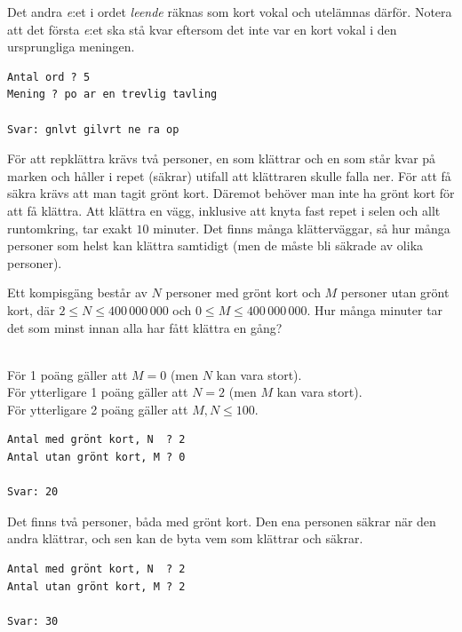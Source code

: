  Det andra \emph{e}:et i ordet \emph{leende} räknas som kort vokal och utelämnas därför. Notera att det första \emph{e}:et ska stå kvar eftersom det inte var en kort vokal i den ursprungliga meningen.

\vspace{1cm}

\begin{verbatim}
Antal ord ? 5
Mening ? po ar en trevlig tavling

Svar: gnlvt gilvrt ne ra op
\end{verbatim}


\newpage
{}

För att repklättra krävs två personer, en som klättrar och en som står kvar på marken och håller i repet (säkrar) utifall att klättraren skulle falla ner.
För att få säkra krävs att man tagit grönt kort.
Däremot behöver man inte ha grönt kort för att få klättra.
Att klättra en vägg, inklusive att knyta fast repet i selen och allt runtomkring, tar exakt $10$ minuter.
Det finns många klätterväggar, så hur många personer som helst kan klättra samtidigt (men de måste bli säkrade av olika personer).

Ett kompisgäng består av $N$ personer med grönt kort och $M$ personer utan grönt kort, där $2 \le N \le 400\,000\,000$ och $0 \le M \le 400\,000\,000$. Hur många minuter tar det som minst innan alla har fått klättra en gång?

\\
För 1 poäng gäller att $M = 0$ (men $N$ kan vara stort).\\
För ytterligare 1 poäng gäller att $N = 2$ (men $M$ kan vara stort).\\
För ytterligare 2 poäng gäller att $M,N \le 100$.


\vspace{0.5cm}

\begin{verbatim}
Antal med grönt kort, N  ? 2
Antal utan grönt kort, M ? 0

Svar: 20
\end{verbatim}

 Det finns två personer, båda med grönt kort.
Den ena personen säkrar när den andra klättrar, och sen kan de byta vem som klättrar och säkrar. 

\vspace{0.5cm}

\begin{verbatim}
Antal med grönt kort, N  ? 2
Antal utan grönt kort, M ? 2

Svar: 30
\end{verbatim}

